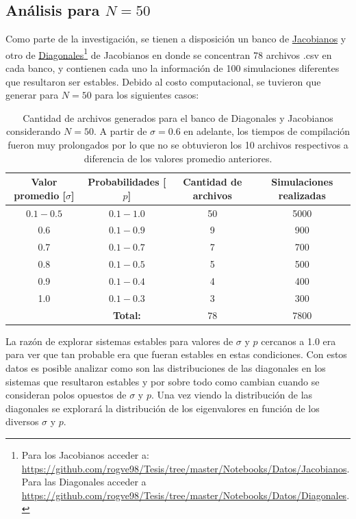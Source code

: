 \subsection{Análisis para $N=50$}

Como parte de la investigación, se tienen  a disposición un banco de \href{https://github.com/rogve98/Tesis/tree/master/Notebooks/Datos/Jacobianos}{Jacobianos} y otro de \href{https://github.com/rogve98/Tesis/tree/master/Notebooks/Datos/Diagonales}{Diagonales}\footnote{Para los Jacobianos acceder a: \url{https://github.com/rogve98/Tesis/tree/master/Notebooks/Datos/Jacobianos}. Para las Diagonales acceder a \url{https://github.com/rogve98/Tesis/tree/master/Notebooks/Datos/Diagonales}.} de Jacobianos en donde se concentran 78 archivos .csv en cada banco, y contienen cada uno la información de 100 simulaciones diferentes que resultaron ser estables. Debido al costo computacional, se tuvieron que generar para $N=50$ para los siguientes casos:
\begin{table}[h!]
	\centering
	 \begin{tabular}{|c|c|c|c|}
		\hline
		Valor promedio [$\sigma$] & Probabilidades [$p$] & Cantidad de archivos & Simulaciones realizadas \\ \hline
		$0.1-0.5$  & $0.1-1.0$  & 50 & 5000  \\ \hline
		0.6  & $0.1-0.9$  & 9 & 900 \\ \hline
		0.7  & $0.1-0.7$  & 7 & 700 \\ \hline
		0.8  & $0.1-0.5$  & 5 & 500 \\ \hline
		0.9  & $0.1-0.4$  & 4 & 400 \\ \hline
		1.0  & $0.1-0.3$  & 3 & 300 \\ \hline
		& \textbf{Total:} & 78& 7800\\ \hline
	\end{tabular}
	\caption{Cantidad de archivos generados para el banco de Diagonales y Jacobianos considerando $N=50$. A partir de $\sigma=0.6$ en adelante, los tiempos de compilación fueron muy prolongados por lo que no se obtuvieron los 10 archivos respectivos a diferencia de los valores promedio anteriores.}
	\label{tab:ejemplo}
\end{table} 

La razón de explorar sistemas estables para valores de $\sigma$ y $p$ cercanos a 1.0 era para ver que tan probable era que fueran estables en estas condiciones. Con estos datos es posible analizar como son las distribuciones de las diagonales en los sistemas que resultaron estables y por sobre todo como cambian cuando se consideran polos opuestos de $\sigma$ y $p$. Una vez viendo la distribución de las diagonales se explorará la distribución de los eigenvalores en función de los diversos $\sigma$ y $p$.

